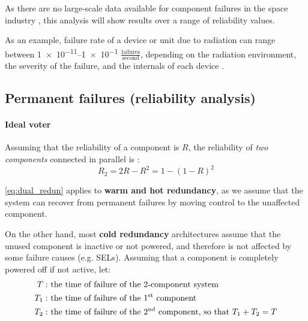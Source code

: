 \documentclass[a4paper,nobib]{tufte-book}
\def\acusepage#1{}
\begin{document}
As there are no large-scale data available for component failures in the space industry \autocite{esatec-qqd_effective_reliability_2016}, this analysis will show results over a range of reliability values.

As an example, failure rate of a device or unit due to radiation can range between \SIrange{1e-11}{1e-1}{} \(\frac{\text{failures}}{\text{second}}\), depending on the radiation environment, the severity of the failure, and the internals of each device \autocite[158-159]{gupta_analysis_single_2017}.


\subsection{Permanent failures (reliability analysis)}

\paragraph{\textbf{Ideal voter}}\hspace{0pt}
\acusepage{voter}


Assuming that the reliability of a component is \(R\), the reliability of \emph{two components} connected in parallel is \autocite[31]{birolini_reliability_engineering_2004}:
\begin{equation}
R_2 = 2R - R^2 = 1 - (1 - R)^2 \label{eq:dual_redun}
\end{equation}
	
	
\eqref{eq:dual_redun} applies to \textbf{warm and hot redundancy}, as we assume that the system can recover from permanent failures by moving control to the unaffected component.

On the other hand, most \textbf{cold redundancy} architectures assume that the unused component is inactive or not powered, and therefore is not affected by some failure causes (e.g. \acsp{SEL}). Assuming that a component is completely powered off if not active, let:
\begin{align*}
T: & \text{ the time of failure of the 2-component system}\\
T_1: & \text{ the time of failure of the 1\textsuperscript{st} component}\\
T_2: & \text{ the time of failure of the 2\textsuperscript{nd} component, so that } T_1 + T_2 = T\\
\end{align*}
\end{document}

